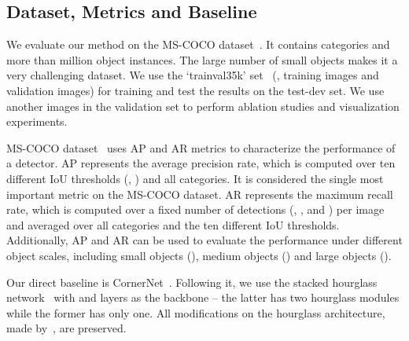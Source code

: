 \documentclass[10pt,twocolumn,letterpaper]{article}
\begin{document}
\subsection{Dataset, Metrics and Baseline}
\label{sec:setting}

We evaluate our method on the MS-COCO dataset~\cite{lin2014microsoft}. It contains  categories and more than  million object instances. The large number of small objects makes it a very challenging dataset. We use the `trainval35k' set~\cite{hoiem2012diagnosing} (\ie,  training images and  validation images) for training and test the results on the test-dev set. We use another  images in the validation set to perform ablation studies and visualization experiments.

MS-COCO dataset~\cite{lin2014microsoft} uses AP and AR metrics to characterize the performance of a detector. AP represents the average precision rate, which is computed over ten different IoU thresholds (\ie, ) and all categories. It is considered the single most important metric on the MS-COCO dataset. AR represents the maximum recall rate, which is computed over a fixed number of detections (\ie, ,  and  ) per image and averaged over all categories and the ten different IoU thresholds. Additionally, AP and AR can be used to evaluate the performance under different object scales, including small objects (), medium objects () and large objects ().

Our direct baseline is CornerNet~\cite{law2018cornernet}. Following it, we use the stacked hourglass network~\cite{newell2016stacked} with  and  layers as the backbone -- the latter has two hourglass modules while the former has only one. All modifications on the hourglass architecture, made by~\cite{law2018cornernet}, are preserved.
\end{document}
